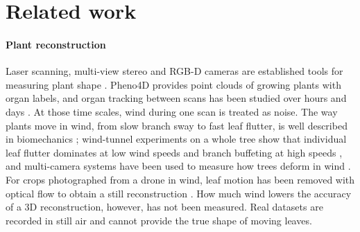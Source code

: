 \documentclass[preprint,11pt,authoryear]{elsarticle}
\begin{document}
\section{Related work}
\paragraph{Plant reconstruction} Laser scanning, multi-view stereo and RGB-D cameras are established tools for measuring plant shape \citep{paulus2019crops3d}. Pheno4D \citep{schunck2021pheno4d} provides point clouds of growing plants with organ labels, and organ tracking between scans has been studied over hours and days \citep{li2013growing}. At those time scales, wind during one scan is treated as noise. The way plants move in wind, from slow branch sway to fast leaf flutter, is well described in biomechanics \citep{delangre2008wind}; wind-tunnel experiments on a whole tree show that individual leaf flutter dominates at low wind speeds and branch buffeting at high speeds \citep{tadrist2018foliage}, and multi-camera systems have been used to measure how trees deform in wind \citep{kammel2024treestreamlining}. For crops photographed from a drone in wind, leaf motion has been removed with optical flow to obtain a still reconstruction \citep{rochow2025motion}. How much wind lowers the accuracy of a 3D reconstruction, however, has not been measured. Real datasets are recorded in still air and cannot provide the true shape of moving leaves.
\end{document}
